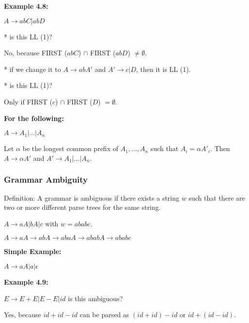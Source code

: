 \documentclass[twocolumn]{article}
\begin{document}
\textbf{Example 4.8:}

$A \to abC | abD$

* is this LL (1)? 

No, because FIRST ($abC$) $\cap$ FIRST ($abD$) $\neq \emptyset$.

* if we change it to $A \to abA'$ and $A' \to c | D$, then it is LL (1).

* is this LL (1)? 

Only if FIRST ($c$) $\cap$ FIRST ($D$) $= \emptyset$.

\textbf{For the following:}

$A \to A _1 | \dots | A _n$

Let $\alpha$ be the longest common prefix of $A _1, \dots, A _n$ such that $A _i = \alpha A' _i$. 
Then $A \to \alpha A'$ and $A' \to A _1 | \dots | A _n$.

\subsubsection{Grammar Ambiguity}

Definition: A grammar is ambiguous if there exists a string $w$ such that there are two or more different parse trees for the same string.

$A \to aA | bA | c$ with $w = ababc$.

$A \to aA \to abA \to abaA \to ababA \to ababc$

\textbf{Simple Example:}

$A \to aA | a | \mathcal{\epsilon}$

\textbf{Example 4.9:}

$E \to E + E | E - E | id$ is this ambiguous?

Yes, because $id + id - id$ can be parsed as $(id + id) - id$ or $id + (id - id)$.
\end{document}
